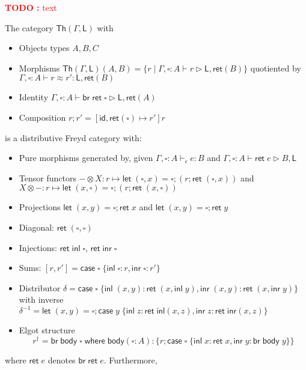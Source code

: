\documentclass[acmsmall,screen,review]{acmart}
\newcounter{todos}
\newcommand{\TODO}[1]{{
  \stepcounter{todos}
  \begin{center}\large{\textcolor{red}{\textbf{TODO \arabic{todos}:} #1}}\end{center}
}}
\newcommand{\ms}[1]{\ensuremath{\mathsf{#1}}}
\newcommand{\lto}{:}
\newcommand{\linl}[1]{\ms{inl}\;{#1}}
\newcommand{\linr}[1]{\ms{inr}\;{#1}}
\newcommand{\casestmt}[5]{\ms{case}\;#1\;\{\linl{#2} \lto #3, \linr{#4} \lto #5\}}
\newcommand{\where}[2]{#1\;\ms{where}\;#2}
\newcommand{\wbranch}[3]{#1(#2) \lto \{#3\}}
\newcommand{\bhyp}[2]{#1 : #2}
\newcommand{\hasty}[4]{#1 \vdash_{#2} #3: {#4}}
\newcommand{\haslb}[3]{#1 \vdash #2 \rhd #3}
\newcommand{\teqv}{\approx}
\newcommand{\lbeq}[4]{#1 \vdash #2 \teqv #3 : {#4}}
\newcommand{\invar}{\square}
\begin{document}
\TODO{text}

\begin{theorem}
  The category $\ms{Th}(\Gamma, \ms{L})$ with
  \begin{itemize}
    \item Objects types $A, B, C$
    \item Morphisms $\ms{Th}(\Gamma, \ms{L})(A, B) 
      = \{r \mid \haslb{\Gamma, \bhyp{\invar}{A}}{r}{\ms{L}, \ms{ret}(B)}\}$ quotiented by
      $\lbeq{\Gamma, \bhyp{\invar}{A}}{r}{r'}{\ms{L}, \ms{ret}(B)}$
    \item Identity $\haslb{\Gamma, \bhyp{\invar}{A}}{\ms{br}\;\ms{ret}\;\invar}{\ms{L}, \ms{ret}(A)}$
    \item Composition $r;r' = [\ms{id}, \ms{ret}(\invar) \mapsto r']r$ 
  \end{itemize}
  is a distributive Freyd category with:
  \begin{itemize}
    \item Pure morphisms generated by, given $\hasty{\Gamma, \bhyp{\invar}{A}}{\epsilon}{e}{B}$ and
          $\haslb{\Gamma, \bhyp{\invar}{A}}{\ms{ret}\;e}{B, \ms{L}}$
    \item Tensor functors 
      $- \otimes X : r \mapsto \ms{let}\;(\invar, x) 
        = \invar; (r ; \ms{ret}\;(\invar, x))$
      and 
      $X \otimes - : r \mapsto \ms{let}\;(x, \invar) 
      = \invar; (r ; \ms{ret}\;(x, \invar))$
    \item Projections $\ms{let}\;(x, y) = \invar; \ms{ret}\;x$ and  
      $\ms{let}\;(x, y) = \invar; \ms{ret}\;y$
    \item Diagonal: $\ms{ret}\;(\invar, \invar)$
    \item Injections: $\ms{ret}\;\ms{inl}\;\invar$, $\ms{ret}\;\ms{inr}\;\invar$
    \item Sums: $
      [r, r'] = \casestmt{\invar}{\invar}{r}{\invar}{r'}
    $
    \item Distributor
      $\delta = \casestmt{\invar}{(x, y)}{\ms{ret}\;(x, \ms{inl}\;y)}{(x, y)}{\ms{ret}\;(x, \ms{inr}\;y)}$
      with inverse
      $\delta^{-1} = \ms{let}\;(x, y) = \invar; 
        \casestmt{y}{z}{\ms{ret}\;\ms{inl}(x, z)}{z}{\ms{ret}\;\ms{inr}(x, z)}$
    \item Elgot structure 
    $$
      r^\dagger = \where{\ms{br}\;\ms{body}\;\invar}{\wbranch{\ms{body}}{\invar : A}
        {r ; \casestmt{\invar}{x}{\ms{ret}\;x}{y}{\ms{br}\;\ms{body}\;y}}}
    $$
  \end{itemize}
  where $\ms{ret}\;e$ denotes $\ms{br}\;\ms{ret}\;e$. Furthermore,

\end{theorem}
\end{document}
